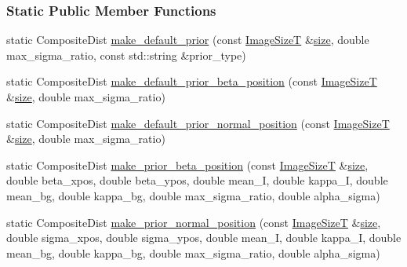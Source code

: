 \subsubsection*{Static Public Member Functions}
\begin{DoxyCompactItemize}
\item 
static Composite\+Dist \hyperlink{classmappel_1_1Gauss2DsModel_a5f730333cb51b9586892cfd5bb566bf1}{make\+\_\+default\+\_\+prior} (const \hyperlink{classmappel_1_1ImageFormat2DBase_a49cccf61eb2a768a202634d27fcd81d5}{Image\+SizeT} \&\hyperlink{classmappel_1_1ImageFormat2DBase_a3be77d2aa6ec9f3815322732950c2a60}{size}, double max\+\_\+sigma\+\_\+ratio, const std\+::string \&prior\+\_\+type)
\item 
static Composite\+Dist \hyperlink{classmappel_1_1Gauss2DsModel_aaad8b5a9355f37ecac6763acbf60bfe3}{make\+\_\+default\+\_\+prior\+\_\+beta\+\_\+position} (const \hyperlink{classmappel_1_1ImageFormat2DBase_a49cccf61eb2a768a202634d27fcd81d5}{Image\+SizeT} \&\hyperlink{classmappel_1_1ImageFormat2DBase_a3be77d2aa6ec9f3815322732950c2a60}{size}, double max\+\_\+sigma\+\_\+ratio)
\item 
static Composite\+Dist \hyperlink{classmappel_1_1Gauss2DsModel_a19b5d93feda4f83a9b1b8b6df0e2ebc5}{make\+\_\+default\+\_\+prior\+\_\+normal\+\_\+position} (const \hyperlink{classmappel_1_1ImageFormat2DBase_a49cccf61eb2a768a202634d27fcd81d5}{Image\+SizeT} \&\hyperlink{classmappel_1_1ImageFormat2DBase_a3be77d2aa6ec9f3815322732950c2a60}{size}, double max\+\_\+sigma\+\_\+ratio)
\item 
static Composite\+Dist \hyperlink{classmappel_1_1Gauss2DsModel_a027a8dd814e5e3a6588cc1e5f5225059}{make\+\_\+prior\+\_\+beta\+\_\+position} (const \hyperlink{classmappel_1_1ImageFormat2DBase_a49cccf61eb2a768a202634d27fcd81d5}{Image\+SizeT} \&\hyperlink{classmappel_1_1ImageFormat2DBase_a3be77d2aa6ec9f3815322732950c2a60}{size}, double beta\+\_\+xpos, double beta\+\_\+ypos, double mean\+\_\+I, double kappa\+\_\+I, double mean\+\_\+bg, double kappa\+\_\+bg, double max\+\_\+sigma\+\_\+ratio, double alpha\+\_\+sigma)
\item 
static Composite\+Dist \hyperlink{classmappel_1_1Gauss2DsModel_aa30152146e1a52b340950de7f6a058ba}{make\+\_\+prior\+\_\+normal\+\_\+position} (const \hyperlink{classmappel_1_1ImageFormat2DBase_a49cccf61eb2a768a202634d27fcd81d5}{Image\+SizeT} \&\hyperlink{classmappel_1_1ImageFormat2DBase_a3be77d2aa6ec9f3815322732950c2a60}{size}, double sigma\+\_\+xpos, double sigma\+\_\+ypos, double mean\+\_\+I, double kappa\+\_\+I, double mean\+\_\+bg, double kappa\+\_\+bg, double max\+\_\+sigma\+\_\+ratio, double alpha\+\_\+sigma)

\end{DoxyCompactItemize}

